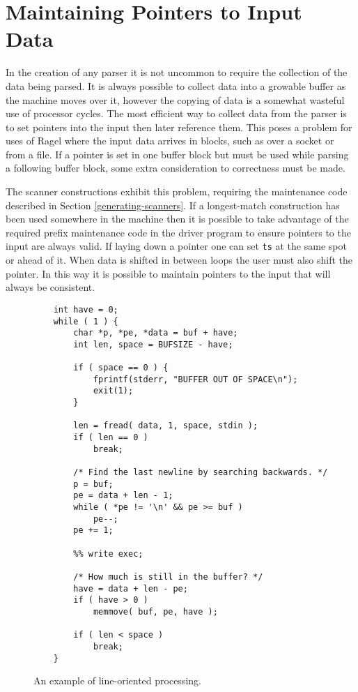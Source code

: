 \documentclass[letterpaper,11pt,oneside]{book}
\begin{document}
\section{Maintaining Pointers to Input Data}

In the creation of any parser it is not uncommon to require the collection of
the data being parsed.  It is always possible to collect data into a growable
buffer as the machine moves over it, however the copying of data is a somewhat
wasteful use of processor cycles. The most efficient way to collect data from
the parser is to set pointers into the input then later reference them.  This
poses a problem for uses of Ragel where the input data arrives in blocks, such
as over a socket or from a file. If a pointer is set in one buffer block but
must be used while parsing a following buffer block, some extra consideration
to correctness must be made.

The scanner constructions exhibit this problem, requiring the maintenance
code described in Section \ref{generating-scanners}. If a longest-match
construction has been used somewhere in the machine then it is possible to
take advantage of the required prefix maintenance code in the driver program to
ensure pointers to the input are always valid. If laying down a pointer one can
set \verb|ts| at the same spot or ahead of it. When data is shifted in
between loops the user must also shift the pointer.  In this way it is possible
to maintain pointers to the input that will always be consistent.

\begin{figure}
\small
\begin{verbatim}
    int have = 0;
    while ( 1 ) {
        char *p, *pe, *data = buf + have;
        int len, space = BUFSIZE - have;

        if ( space == 0 ) { 
            fprintf(stderr, "BUFFER OUT OF SPACE\n");
            exit(1);
        }

        len = fread( data, 1, space, stdin );
        if ( len == 0 )
            break;

        /* Find the last newline by searching backwards. */
        p = buf;
        pe = data + len - 1;
        while ( *pe != '\n' && pe >= buf )
            pe--;
        pe += 1;

        %% write exec;

        /* How much is still in the buffer? */
        have = data + len - pe;
        if ( have > 0 )
            memmove( buf, pe, have );

        if ( len < space )
            break;
    }
\end{verbatim}
\caption{An example of line-oriented processing.
}
\label{line-oriented}
\end{figure}
\end{document}
